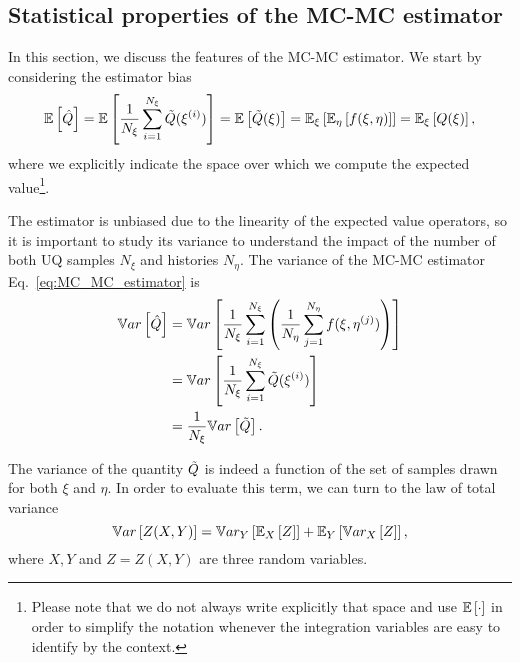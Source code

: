 \subsection{Statistical properties of the MC-MC estimator}
\label{kbc:sec:StatisticalProperties}
In this section, we discuss the features of the MC-MC estimator. We start by considering the estimator bias
\begin{equation}
\mathbb{E}\left[ \hat{Q} \right] = \mathbb{E}\left[ \frac{1}{N_\xi} \sum_{i=1}^{N_\xi} \tilde{Q}(\xi^{(i)}) \right] = \mathbb{E}\left[  \tilde{Q}(\xi) \right] = \mathbb{E}_\xi\left[ \mathbb{E}_\eta\left[ f(\xi,\eta) \right] \right] = \mathbb{E}_\xi\left[ Q(\xi) \right],
\end{equation}
where we explicitly indicate the space over which we compute the expected value\footnote{Please note that we do not always write explicitly that space and use $\mathbb{E}\left[\cdot\right]$ in order to simplify the notation whenever the integration variables are easy to identify by the context.}.

The estimator is unbiased due to the linearity of the expected value operators, so it is important to study its variance to understand the impact of the number of both UQ samples $N_\xi$ and histories $N_\eta$. The variance of the MC-MC estimator Eq.~\eqref{eq:MC_MC_estimator} is
\begin{equation}
 \label{eq:MC_MC_estimator_va_I}
 \begin{split}
 \mathbb{V}ar\left[ \hat{Q} \right] &= \mathbb{V}ar\left[ \frac{1}{N_\xi} \sum_{i=1}^{N_\xi} \left( \frac{1}{N_\eta} \sum_{j=1}^{N_\eta} f( \xi, \eta^{(j)} ) \right) \right] \\
               &= \mathbb{V}ar\left[ \frac{1}{N_\xi} \sum_{i=1}^{N_\xi} \tilde{Q}(\xi^{(i)})  \right] \\
               &= \frac{1}{N_\xi} \mathbb{V}ar\left[ \tilde{Q} \right].
 \end{split}
\end{equation}

The variance of the quantity $\tilde{Q}$ is indeed a function of the set of samples drawn for both $\xi$ and $\eta$. In order to evaluate this term, we can turn to the law of total variance
\begin{equation}
  \mathbb{V}ar\left[Z(X,Y)\right] = \mathbb{V}ar_{Y}\left[ \mathbb{E}_{X}\left[Z \right] \right] + \mathbb{E}_{Y}\left[ \mathbb{V}ar_{X}\left[ Z \right] \right], 
\end{equation}
where $X,Y$ and $Z=Z(X,Y)$ are three random variables.

